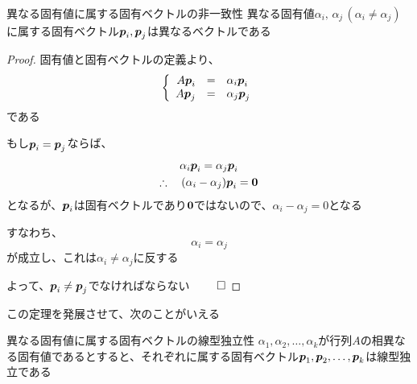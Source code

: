 \documentclass[../../../topic_linear-algebra]{subfiles}
\begin{document}
\begin{theorem}{異なる固有値に属する固有ベクトルの非一致性}
  異なる固有値$\alpha_i,\, \alpha_j \, (\alpha_i \neq \alpha_j)$に属する固有ベクトル$\vb*{p}_i, \vb*{p}_j$は異なるベクトルである
\end{theorem}

\begin{proof}
  固有値と固有ベクトルの定義より、
  \begin{equation*}
    \left\{
    \begin{array}{rcl}
      A\vb*{p}_i & = & \alpha_i \vb*{p}_i \\
      A\vb*{p}_j & = & \alpha_j \vb*{p}_j
    \end{array}
    \right.
  \end{equation*}
  である

  もし$\vb*{p}_i = \vb*{p}_j$ならば、
  \begin{gather*}
    \alpha_i \vb*{p}_i              = \alpha_j \vb*{p}_i \\
    \therefore \quad (\alpha_i - \alpha_j) \vb*{p}_i = \vb*{0}
  \end{gather*}
  となるが、$\vb*{p}_i$は固有ベクトルであり$\vb*{0}$ではないので、$\alpha_i - \alpha_j = 0$となる

  すなわち、
  \begin{equation*}
    \alpha_i = \alpha_j
  \end{equation*}
  が成立し、これは$\alpha_i \neq \alpha_j$に反する

  よって、$\vb*{p}_i \neq \vb*{p}_j$でなければならない $\qed$
\end{proof}

この定理を発展させて、次のことがいえる

\begin{theorem}{異なる固有値に属する固有ベクトルの線型独立性}\label{thm:eigenvectors-of-distinct-eigenvalues-are-independent}
  $\alpha_1, \alpha_2, \ldots, \alpha_k$が行列$A$の相異なる固有値であるとすると、それぞれに属する固有ベクトル$\vb*{p}_1, \vb*{p}_2, \ldots, \vb*{p}_k$は線型独立である
\end{theorem}
\end{document}
